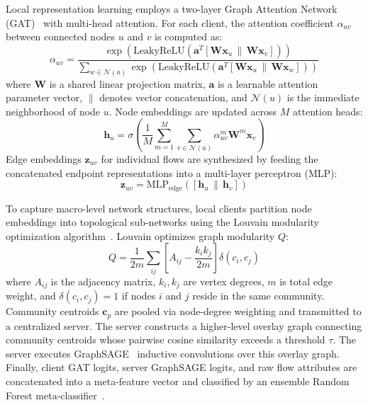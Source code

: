 \documentclass[journal,onecolumn]{IEEEtran}
\begin{document}
Local representation learning employs a two-layer Graph Attention Network (GAT)~\cite{velickovic2018gat} with multi-head attention. For each client, the attention coefficient $\alpha_{uv}$ between connected nodes $u$ and $v$ is computed as:
\begin{equation}
\alpha_{uv} = \frac{\exp\left(\text{LeakyReLU}\left(\boldsymbol{a}^T [\boldsymbol{W}\boldsymbol{x}_u \,\|\, \boldsymbol{W}\boldsymbol{x}_v]\right)\right)}{\sum_{w \in \mathcal{N}(u)} \exp\left(\text{LeakyReLU}\left(\boldsymbol{a}^T [\boldsymbol{W}\boldsymbol{x}_u \,\|\, \boldsymbol{W}\boldsymbol{x}_w]\right)\right)}
\label{eq:gat_attention}
\end{equation}
where $\boldsymbol{W}$ is a shared linear projection matrix, $\boldsymbol{a}$ is a learnable attention parameter vector, $\|$ denotes vector concatenation, and $\mathcal{N}(u)$ is the immediate neighborhood of node $u$. Node embeddings are updated across $M$ attention heads:
\begin{equation}
\boldsymbol{h}_u = \sigma\left( \frac{1}{M} \sum_{m=1}^M \sum_{v \in \mathcal{N}(u)} \alpha_{uv}^m \boldsymbol{W}^m \boldsymbol{x}_v \right)
\label{eq:gat_update}
\end{equation}
Edge embeddings $\boldsymbol{z}_{uv}$ for individual flows are synthesized by feeding the concatenated endpoint representations into a multi-layer perceptron (MLP):
\begin{equation}
\boldsymbol{z}_{uv} = \text{MLP}_{\text{edge}}\left([\boldsymbol{h}_u \,\|\, \boldsymbol{h}_v]\right)
\label{eq:edge_mlp}
\end{equation}

To capture macro-level network structures, local clients partition node embeddings into topological sub-networks using the Louvain modularity optimization algorithm~\cite{blondel2008louvain}. Louvain optimizes graph modularity $Q$:
\begin{equation}
Q = \frac{1}{2m} \sum_{ij} \left[ A_{ij} - \frac{k_i k_j}{2m} \right] \delta(c_i, c_j)
\label{eq:louvain_modularity}
\end{equation}
where $A_{ij}$ is the adjacency matrix, $k_i, k_j$ are vertex degrees, $m$ is total edge weight, and $\delta(c_i, c_j) = 1$ if nodes $i$ and $j$ reside in the same community. Community centroids $\boldsymbol{c}_p$ are pooled via node-degree weighting and transmitted to a centralized server. The server constructs a higher-level overlay graph connecting community centroids whose pairwise cosine similarity exceeds a threshold $\tau$. The server executes GraphSAGE~\cite{hamilton2017graphsage} inductive convolutions over this overlay graph. Finally, client GAT logits, server GraphSAGE logits, and raw flow attributes are concatenated into a meta-feature vector and classified by an ensemble Random Forest meta-classifier~\cite{breiman2001randomforests}.
\end{document}
